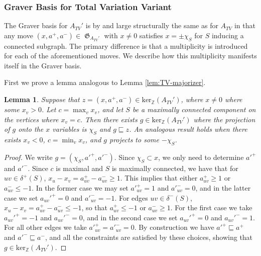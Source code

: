 \documentclass[pdflatex,sn-mathphys-num]{sn-jnl}%
\newtheorem{lemma}[theorem]{Lemma}
\DeclareMathOperator{\Gfrak}{\mathfrak{G}}
\begin{document}


\subsubsection{Graver Basis for Total Variation Variant}

The Graver basis for $A_{TV}'$ is by and large structurally the same as for $A_{TV}$ in that any move $(x, a^+, a^-) \in \Gfrak_{A_{TV}'}$ with $x \ne 0$ satisfies $x = \pm \chi_S$ for $S$ inducing a connected subgraph. The primary difference is that a multiplicity is introduced for each of the aforementioned moves. We describe how this multiplicity manifests itself in the Graver basis.

First we prove a lemma analogous to Lemma \ref{lem:TV-majorizer}.
\begin{lemma} \label{lem:TV-prime-majorizer}
    Suppose that $z = (x, a^+, a^-) \in \text{ker}_{\mathbb{Z}}(A_{TV}')$, where $x \ne 0$ where some $x_v > 0$. Let $c = \max_v x_v$, and let $S$ be a maximally connected component on the vertices where $x_v = c$. Then there exists $g \in \text{ker}_{\mathbb{Z}}(A_{TV}')$ where the projection of $g$ onto the $x$ variables is $\chi_S$ and $g \sqsubseteq z$. An analogous result holds when there exists $x_v < 0$, $c = \min_v x_v$, and $g$ projects to some $-\chi_S$.
\end{lemma}
\begin{proof}
    We write $g = (\chi_S, a'^+, a'^-)$. Since $\chi_S \subset x$, we only need to determine $a'^+$ and $a'^-$. Since $c$ is maximal and $S$ is maximally connected, we have that for $uv \in \delta^+(S)$, $x_u - x_v = a_{uv}^+ - a_{uv}^- \ge 1$. This implies that either $a_{uv}^+ \ge 1$ or $a_{uv}^- \le -1$. In the former case we may set $a'^+_{uv} = 1$ and $a'^-_{uv} = 0$, and in the latter case we set $a_{uv}'^+ = 0$ and $a'^-_{uv} = -1$. For edges $uv \in \delta^-(S)$, $x_u - x_v = a_{uv}^+ - a_{uv}^- \le -1$, so that $a_{uv}^+ \le -1$ or $a_{uv}^- \ge 1$. For the first case we take $a_{uv}'^+ = -1$ and $a_{uv}'^- = 0$, and in the second case we set $a_{uv}'^+ = 0$ and $a_{uv}'^- = 1$. For all other edges we take $a'^+_{uv} = a'^-_{uv} = 0$. By construction we have $a'^+ \sqsubseteq a^+$ and $a'^- \sqsubseteq a^-$, and all the constraints are satisfied by these choices,  showing that $g \in \text{ker}_{\mathbb{Z}}({A_{TV}'})$.
\end{proof}
\end{document}
